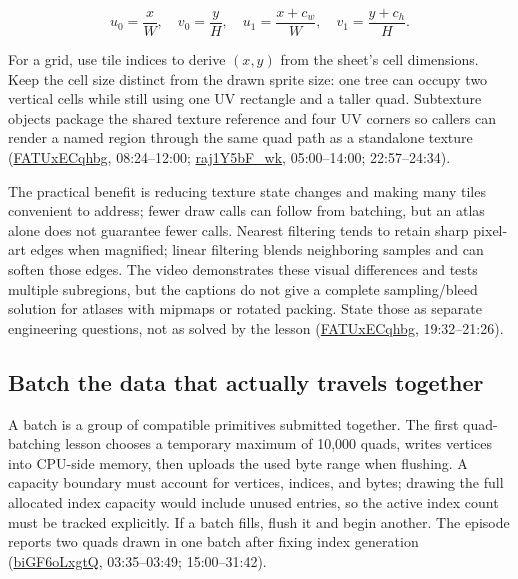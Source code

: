 \[u_0=\frac{x}{W},\quad v_0=\frac{y}{H},\quad u_1=\frac{x+c_w}{W},\quad v_1=\frac{y+c_h}{H}.\]

For a grid, use tile indices to derive \((x,y)\) from the sheet's cell dimensions. Keep the cell size distinct from the drawn sprite size: one tree can occupy two vertical cells while still using one UV rectangle and a taller quad. Subtexture objects package the shared texture reference and four UV corners so callers can render a named region through the same quad path as a standalone texture (\href{https://www.youtube.com/watch?v=FATUxECqhbg}{FATUxECqhbg}, 08:24--12:00; \href{https://www.youtube.com/watch?v=raj1Y5bF_wk}{raj1Y5bF\_wk}, 05:00--14:00; 22:57--24:34).

The practical benefit is reducing texture state changes and making many tiles convenient to address; fewer draw calls can follow from batching, but an atlas alone does not guarantee fewer calls. Nearest filtering tends to retain sharp pixel-art edges when magnified; linear filtering blends neighboring samples and can soften those edges. The video demonstrates these visual differences and tests multiple subregions, but the captions do not give a complete sampling/bleed solution for atlases with mipmaps or rotated packing. State those as separate engineering questions, not as solved by the lesson (\href{https://www.youtube.com/watch?v=FATUxECqhbg}{FATUxECqhbg}, 19:32--21:26).

\subsection{Batch the data that actually travels together}\label{06-engine-ii-ch026-batch-the-data-that-actually-travels-together}

\hypertarget{06-engine-ii-ch026-batch-the-data-that-actually-travels-together}{}

A batch is a group of compatible primitives submitted together. The first quad-batching lesson chooses a temporary maximum of 10,000 quads, writes vertices into CPU-side memory, then uploads the used byte range when flushing. A capacity boundary must account for vertices, indices, and bytes; drawing the full allocated index capacity would include unused entries, so the active index count must be tracked explicitly. If a batch fills, flush it and begin another. The episode reports two quads drawn in one batch after fixing index generation (\href{https://www.youtube.com/watch?v=biGF6oLxgtQ}{biGF6oLxgtQ}, 03:35--03:49; 15:00--31:42).

